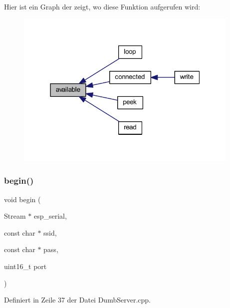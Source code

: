 Hier ist ein Graph der zeigt, wo diese Funktion aufgerufen wird\+:\nopagebreak
\begin{figure}[H]
\begin{center}
\leavevmode
\includegraphics[width=304pt]{class_esp_server_a4549a76725f2e4c013e4d57018366109_icgraph}
\end{center}
\end{figure}
\mbox{\label{class_esp_server_a1d8682ca0934af03639311e23a71283f}} 
\subsubsection{\texorpdfstring{begin()}{begin()}}
{\footnotesize\ttfamily void begin (\begin{DoxyParamCaption}\item[{Stream $\ast$}]{esp\+\_\+serial,  }\item[{const char $\ast$}]{ssid,  }\item[{const char $\ast$}]{pass,  }\item[{uint16\+\_\+t}]{port }\end{DoxyParamCaption})}



Definiert in Zeile 37 der Datei Dumb\+Server.\+cpp.


